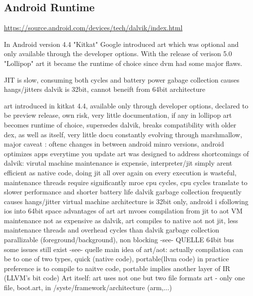 \subsection{Android Runtime} \label{subsection:android-art}

\url{https://source.android.com/devices/tech/dalvik/index.html}


In Android version 4.4 "Kitkat" Google introduced \gls{art} which was optional and only available through the developer options.
With the release of verison 5.0 "Lollipop" \gls{art} it became the runtime of choice since \gls{dvm} had some major flaws.


JIT is slow, consuming both cycles and battery power
gabage collection causes hangs/jitters
dalvik is 32bit, cannot beneift from 64bit architecture

%
art introduced in kitkat 4.4, available only through developer options,  declared to be preview release, own risk, very little documentation, if any
in lollipop art becomes runtime of choice, supersedes dalvik, breaks compatibility with older dex, as well as itself, very little docu
constantly evolving  through marshmallow, major caveat : oftenc changes in between android minro versions, android optimizes apps everytime you update\newline
art was designed to address shortcomings of dalvik:
virutal machine maintenance is expensie, interpreter/jit simply arent efficient as native code, doing jit all over again on every execution is wasteful, maintenance threads require significantly mroe cpu cycles, cpu cycles translate to slower performance and shorter battery life
dalvik garbage collection frequently causes hangs/jitter
virtual machine architecture is 32bit only, android i sfollowing ios into 64bit space\newline
advantages of art
art mvoes compilation from \gls{jit} to \gls{aot}
VM maintenance not as expensive as dalvik, art compiles to native \gls{aot} not \gls{jit}, less maintenance threads and overhead cycles than dalvik
garbage collection parallizable (foreground/background), non blocking -see- QUELLE
64bit bus some issues still exist -see- quelle\newline
main idea of art/aot:
actually compilation can be to one of two types, quick (native code), portable(llvm code)
in practice preference is to compile to naitve code, portable implies another layer of IR (LLVM's bit code)\newline
Art itself:
art uses not one but two file formats
art - only one file, boot.art, in /syste/framework/architecture (arm,...)
